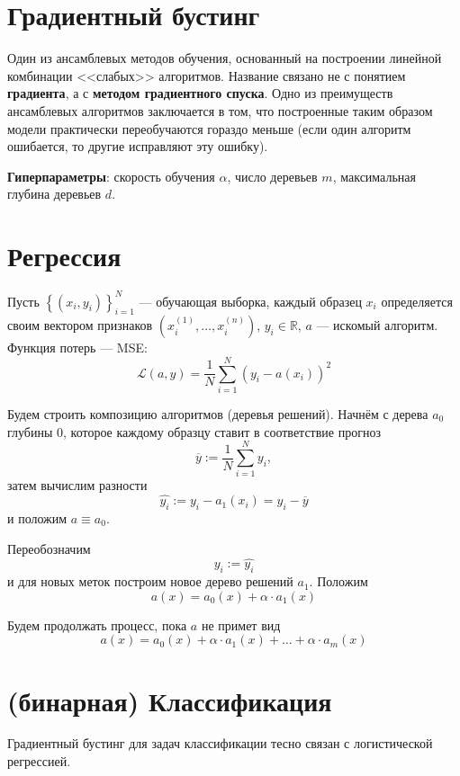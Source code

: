 \documentclass[12pt]{article}
\begin{document}
	\section*{Градиентный бустинг}
	Один из ансамблевых методов обучения, основанный на построении линейной комбинации <<слабых>> алгоритмов. Название связано не с понятием \textbf{градиента}, а с \textbf{методом градиентного спуска}. Одно из преимуществ ансамблевых алгоритмов заключается в том, что построенные таким образом модели практически переобучаются гораздо меньше (если один алгоритм ошибается, то другие исправляют эту ошибку).
	
	\textbf{Гиперпараметры}: скорость обучения $\alpha$, число деревьев $m$, максимальная глубина деревьев $d$.
	\section*{Регрессия}
	Пусть $\left\{(x_i,y_i)\right\}_{i=1}^{N}$ --- обучающая выборка, каждый образец $x_i$ определяется своим вектором признаков $(x_i^{(1)},\dots, x_i^{(n)})$, $y_i\in\mathbb{R}$, $a$ --- искомый алгоритм. Функция потерь --- MSE:
	\begin{equation*}
		\mathcal{L}(a,y)=\frac{1}{N}\sum\limits_{i=1}^{N}(y_i-a(x_i))^2
	\end{equation*}

Будем строить композицию алгоритмов (деревья решений). Начнём с дерева $a_0$ глубины $0$, которое каждому образцу ставит в соответствие прогноз
\begin{equation*}
	\overline{y}:=\frac{1}{N}\sum\limits_{i=1}^{N}y_i,
\end{equation*}
затем вычислим разности
\begin{equation*}
	\widehat{y_i}:=y_i-a_1(x_i)=y_i-\overline{y}
\end{equation*}
и положим $a\equiv a_0$.

Переобозначим
\begin{equation*}
	y_i:=\widehat{y_i}
\end{equation*}
и для новых меток построим новое дерево решений $a_1$. Положим
\begin{equation*}
	a(x)=a_0(x)+\alpha\cdot a_1(x)
\end{equation*}

Будем продолжать процесс, пока $a$ не примет вид
\begin{equation*}
	a(x)=a_0(x)+\alpha\cdot a_1(x)+\dots+\alpha\cdot a_m(x)
\end{equation*}
	\section*{(бинарная) Классификация}
	Градиентный бустинг для задач классификации тесно связан с логистической регрессией.
	
\end{document}
